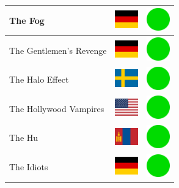 \documentclass[12pt, a4paper, twoside]{report}
\begin{document}
\begin{center}
\begin{longtable}{|p{5cm}|p{2cm}|p{2cm}|}
 The Fog                                                    & \includegraphics[width=1cm]{4x3/de} &   \includegraphics[width=1cm]{likes/y} \\ \hline
 The Gentlemen's Revenge                                    & \includegraphics[width=1cm]{4x3/de} &   \includegraphics[width=1cm]{likes/y} \\ \hline
 The Halo Effect                                            & \includegraphics[width=1cm]{4x3/se} &   \includegraphics[width=1cm]{likes/y} \\ \hline
 The Hollywood Vampires                                     & \includegraphics[width=1cm]{4x3/us} &   \includegraphics[width=1cm]{likes/y} \\ \hline
 The Hu                                                     & \includegraphics[width=1cm]{4x3/mn} &   \includegraphics[width=1cm]{likes/y} \\ \hline
 The Idiots                                                 & \includegraphics[width=1cm]{4x3/de} &   \includegraphics[width=1cm]{likes/y} \\ \hline

\end{longtable}
\end{center}
\end{document}
